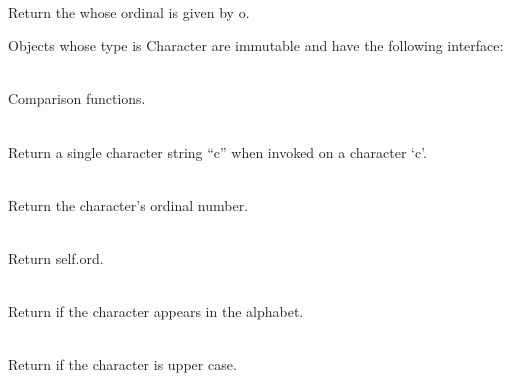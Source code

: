 \begin{desc}
  \item[\kw{function} Literal\/\LB{}o \CO{} \tn{Integer}\/\RB{} \returns{} \/\LB{}\tn{Character}\/\RB{}]~\\
    Return the  whose ordinal is given by o.
\end{desc}

\noindent Objects whose type is Character are immutable and have the
following interface:

\begin{desc}
  \item[\kw{function} \opd{$>$} \/\LB{}\tn{Character}\/\RB{} \returns{} \/\LB{}\tn{Boolean}\/\RB{}]
  \item[\kw{function} \opd{$>=$} \/\LB{}\tn{Character}\/\RB{} \returns{} \/\LB{}\tn{Boolean}\/\RB{}]
  \item[\kw{function} \opd{$<$} \/\LB{}\tn{Character}\/\RB{} \returns{} \/\LB{}\tn{Boolean}\/\RB{}]
  \item[\kw{function} \opd{$<=$} \/\LB{}\tn{Character}\/\RB{} \returns{} \/\LB{}\tn{Boolean}\/\RB{}]
  \item[\kw{function} \opd{$=$} \/\LB{}\tn{Character}\/\RB{} \returns{} \/\LB{}\tn{Boolean}\/\RB{}]
  \item[\kw{function} \opd{$!=$} \/\LB{}\tn{Character}\/\RB{} \returns{} \/\LB{}\tn{Boolean}\/\RB{}]~\\
  Comparison functions.
  \item[\kw{function} asString \returns{} \/\LB{}\tn{String}\/\RB{}]~\\
    Return a single character string ``c'' when invoked on a character `c'.
  \item[\kw{function} ord \returns{} \/\LB{}\tn{Integer}\/\RB{}]~\\
    Return the character's ordinal number.
  \item[\kw{function} hash \returns{} \/\LB{}\tn{Integer}\/\RB{}]~\\
    Return self.ord.
  \item[\kw{function} isalpha \returns{} \/\LB{}r \CO{} \tn{Boolean}\/\RB{}]~\\
    Return  if the character appears in the alphabet.
  \item[\kw{function} isupper \returns{} \/\LB{}r \CO{} \tn{Boolean}\/\RB{}]~\\
    Return  if the character is upper case.  
  \item[\kw{function} islower \returns{} \/\LB{}r \CO{} \tn{Boolean}\/\RB{}]~\\

\end{desc}

